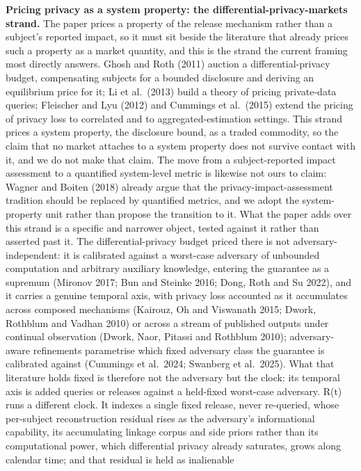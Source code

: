 \documentclass[
  11pt,
]{article}
\begin{document}
\textbf{Pricing privacy as a system property: the
differential-privacy-markets strand.} The paper prices a property of the
release mechanism rather than a subject's reported impact, so it must
sit beside the literature that already prices such a property as a
market quantity, and this is the strand the current framing most
directly answers. Ghosh and Roth (2011) auction a differential-privacy
budget, compensating subjects for a bounded disclosure and deriving an
equilibrium price for it; Li et al.~(2013) build a theory of pricing
private-data queries; Fleischer and Lyu (2012) and Cummings et
al.~(2015) extend the pricing of privacy loss to correlated and to
aggregated-estimation settings. This strand prices a system property,
the disclosure bound, as a traded commodity, so the claim that no market
attaches to a system property does not survive contact with it, and we
do not make that claim. The move from a subject-reported impact
assessment to a quantified system-level metric is likewise not ours to
claim: Wagner and Boiten (2018) already argue that the
privacy-impact-assessment tradition should be replaced by quantified
metrics, and we adopt the system-property unit rather than propose the
transition to it. What the paper adds over this strand is a specific and
narrower object, tested against it rather than asserted past it. The
differential-privacy budget priced there is not adversary-independent:
it is calibrated against a worst-case adversary of unbounded computation
and arbitrary auxiliary knowledge, entering the guarantee as a supremum
(Mironov 2017; Bun and Steinke 2016; Dong, Roth and Su 2022), and it
carries a genuine temporal axis, with privacy loss accounted as it
accumulates across composed mechanisms (Kairouz, Oh and Viswanath 2015;
Dwork, Rothblum and Vadhan 2010) or across a stream of published outputs
under continual observation (Dwork, Naor, Pitassi and Rothblum 2010);
adversary-aware refinements parametrise which fixed adversary class the
guarantee is calibrated against (Cummings et al.~2024; Swanberg et
al.~2025). What that literature holds fixed is therefore not the
adversary but the clock: its temporal axis is added queries or releases
against a held-fixed worst-case adversary. R(t) runs a different clock.
It indexes a single fixed release, never re-queried, whose per-subject
reconstruction residual rises as the adversary's informational
capability, its accumulating linkage corpus and side priors rather than
its computational power, which differential privacy already saturates,
grows along calendar time; and that residual is held as inalienable
\end{document}

